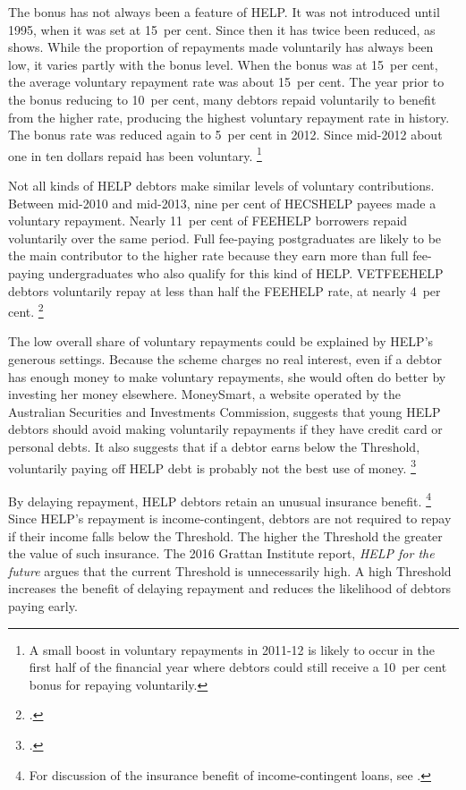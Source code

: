 \documentclass[embargoed]{grattan}
\begin{document}
The bonus has not always been a feature of \gls{HELP}\@.
It was not introduced until 1995, when it was set at 15~per cent.
Since then it has twice been reduced, as  shows.
While the proportion of repayments made voluntarily has always been low, it varies partly with the bonus level.
When the bonus was at 15~per cent, the average voluntary repayment rate was about 15~per cent.
The year prior to the bonus reducing to 10~per cent, many debtors repaid voluntarily to benefit from the higher rate, producing the highest voluntary repayment rate in history.
The bonus rate was reduced again to 5~per cent in 2012.
Since mid-2012 about one in ten dollars repaid has been voluntary.%
\footnote{A small boost in voluntary repayments in 2011-12 is likely to occur in the first half of the financial year where debtors could still receive a 10~per cent bonus for repaying voluntarily.}

Not all kinds of \gls{HELP} debtors make similar levels of voluntary contributions.
Between mid-2010 and mid-2013, nine per cent of \gls{HECSHELP} payees made a voluntary repayment.
Nearly 11~per cent of \gls{FEEHELP} borrowers repaid voluntarily over the same period.
Full fee-paying postgraduates are likely to be the main contributor to the higher rate because they earn more than full fee-paying undergraduates who also qualify for this kind of \gls{HELP}\@.
\gls{VETFEEHELP} debtors voluntarily repay at less than half the \gls{FEEHELP} rate, at nearly 4~per cent.%
\footcite[][33]{ANAO2016AdministrationHigherEducation}

The low overall share of voluntary repayments could be explained by \gls{HELP}'s generous settings.
Because the scheme charges no real interest, even if a debtor has enough money to make voluntary repayments, she would often do better by investing her money elsewhere.
MoneySmart, a website operated by the Australian Securities and Investments Commission, suggests that young \gls{HELP} debtors should avoid making voluntarily repayments if they have credit card or personal debts.
It also suggests that if a debtor earns below the \gls{Threshold}, voluntarily paying off \gls{HELP} debt is probably not the best use of money.%
\footcite{MoneySmart2016Payingyouruni}

By delaying repayment, \gls{HELP} debtors retain an unusual insurance benefit.%
\footnote{For discussion of the insurance benefit of income-contingent loans, see \textcite[][36]{Chapman2014Incomecontingentloans}.} 
Since \gls{HELP}'s repayment is income-contingent, debtors are not required to repay if their income falls below the \gls{Threshold}.
The higher the \gls{Threshold} the greater the value of such insurance.
The 2016 Grattan Institute report, \emph{HELP for the future} argues that the current \gls{Threshold} is unnecessarily high.
A high \gls{Threshold} increases the benefit of delaying repayment and reduces the likelihood of debtors paying early.
\end{document}
